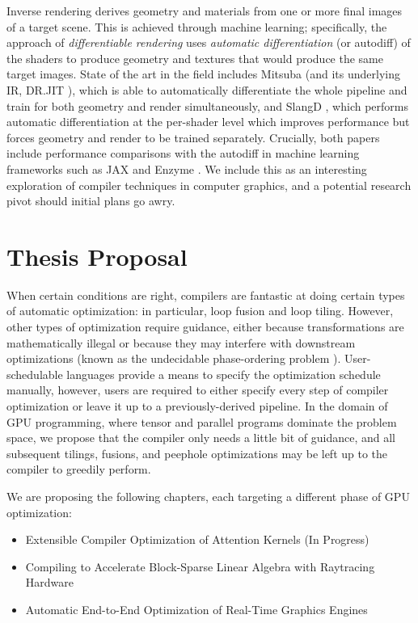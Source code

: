 \documentclass[review, acmsmall, nonacm]{acmart}
\begin{document}
Inverse rendering derives geometry and materials from one or more final images of a target scene. This is achieved through machine learning; specifically, the approach of \emph{differentiable rendering} uses \emph{automatic differentiation} (or autodiff) of the shaders to produce geometry and textures that would produce the same target images. State of the art in the field includes Mitsuba (and its underlying IR, DR.JIT \cite{jakobDRJITJustintimeCompiler2022}), which is able to automatically differentiate the whole pipeline and train for both geometry and render simultaneously, and SlangD \cite{bangaruSLANGDFastModular2023}, which performs automatic differentiation at the per-shader level which improves performance but forces geometry and render to be trained separately. Crucially, both papers include performance comparisons with the autodiff in machine learning frameworks such as JAX \cite{frostigCompilingMachineLearning2018} and Enzyme \cite{mosesScalableAutomaticDifferentiation2022}. We include this as an interesting exploration of compiler techniques in computer graphics, and a potential research pivot should initial plans go awry.

\section{Thesis Proposal}

When certain conditions are right, compilers are fantastic at doing certain types of automatic optimization: in particular, loop fusion and loop tiling. However, other types of optimization require guidance, either because transformations are mathematically illegal or because they may interfere with downstream optimizations (known as the undecidable phase-ordering problem \cite{touatiDecidabilityPhaseOrdering2006}). User-schedulable languages provide a means to specify the optimization schedule manually, however, users are required to either specify every step of compiler optimization or leave it up to a previously-derived pipeline. In the domain of GPU programming, where tensor and parallel programs dominate the problem space, we propose that the compiler only needs a little bit of guidance, and all subsequent tilings, fusions, and peephole optimizations may be left up to the compiler to greedily perform.

We are proposing the following chapters, each targeting a different phase of GPU optimization:
\begin{itemize}
  \item Extensible Compiler Optimization of Attention Kernels (In Progress)
  \item Compiling to Accelerate Block-Sparse Linear Algebra with Raytracing Hardware
  \item Automatic End-to-End Optimization of Real-Time Graphics Engines
\end{itemize}
\end{document}
